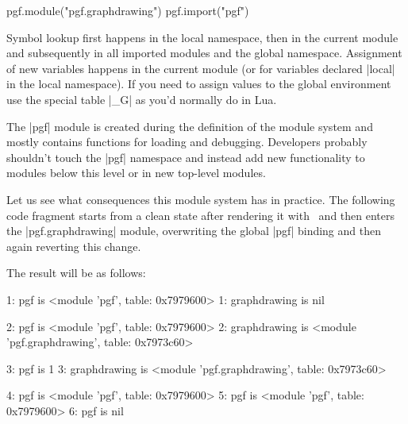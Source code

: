 \begin{codeexample}
pgf.module("pgf.graphdrawing")
pgf.import("pgf")
\end{codeexample}

Symbol lookup first happens in the local namespace, then in the
current module and subsequently in all imported modules and the global
namespace.  Assignment of new variables happens in the current module
(or for variables declared |local| in the local namespace).  If you
need to assign values to the global environment use the special table
|_G| as you'd normally do in Lua.

The |pgf| module is created during the definition of the module system
and mostly contains functions for loading and debugging.  Developers
probably shouldn't touch the |pgf| namespace and instead add new
functionality to modules below this level or in new top-level
modules.

Let us see what consequences this module system has in practice.  The
following code fragment starts from a clean state after rendering it
with \LuaTeX\ and then enters the |pgf.graphdrawing| module,
overwriting the global |pgf| binding and then again reverting this
change.

\begin{codeexample}
\usetikzlibrary{graphdrawing}

\end{codeexample}

The result will be as follows:

\begin{codeexample}
1: pgf is <module 'pgf', table: 0x7979600>
1: graphdrawing is nil

2: pgf is <module 'pgf', table: 0x7979600>
2: graphdrawing is <module 'pgf.graphdrawing', table: 0x7973c60>

3: pgf is 1
3: graphdrawing is <module 'pgf.graphdrawing', table: 0x7973c60>

4: pgf is <module 'pgf', table: 0x7979600>
5: pgf is <module 'pgf', table: 0x7979600>
6: pgf is nil
\end{codeexample}

